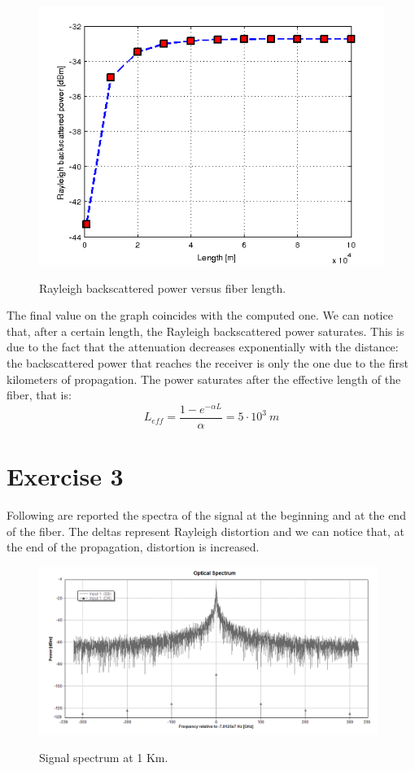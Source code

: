 \documentclass[a4paper,10pt]{report}
\begin{document}
\begin{figure}[!ht]
  \centering
  \includegraphics[width=12cm]{es2.png}\\
  \caption{Rayleigh backscattered power versus fiber length.}
  \label{es2}
\end{figure}

The final value on the graph coincides with the computed one.
We can notice that, after a certain length, the Rayleigh backscattered power saturates.
This is due to the fact that the attenuation decreases exponentially with the distance: the
backscattered power that reaches the receiver is only the one due to the first kilometers of propagation.
The power saturates after the effective length of the fiber, that is: $$L_{eff}=\frac{1-e^{-\alpha L}}{\alpha}=5 \cdot 10^3 \ m$$


\newpage
\section*{Exercise 3}
Following are reported the spectra of the signal at the beginning and at the end of the fiber. The deltas represent Rayleigh distortion and
we can notice that, at the end of the propagation, distortion is increased.

\begin{figure}[!ht]
  \centering
  \includegraphics[width=11cm]{es3_1km.png}\\
  \caption{Signal spectrum at 1 Km.}
  \label{es3_1}
\end{figure}
\end{document}
